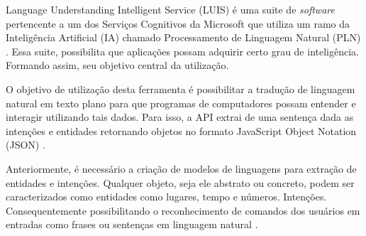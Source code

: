 Language Understanding Intelligent Service (LUIS) é uma suite de \textit{software} pertencente a um dos Serviços Cognitivos da Microsoft que utiliza um ramo da Inteligência Artificial (IA) chamado Processamento de Linguagem Natural (PLN) \cite{Mayo:2017}. Essa suite, possibilita que aplicações possam adquirir certo grau de inteligência. Formando assim, seu objetivo central da utilização.

O objetivo de utilização desta ferramenta é possibilitar a tradução de linguagem natural em texto plano para que programas de computadores possam entender e interagir utilizando tais dados. Para isso, a API extrai de uma sentença dada as intenções e entidades retornando objetos no formato JavaScript Object Notation (JSON) \cite{Mayo:2017}.

Anteriormente, é necessário a criação de modelos de linguagens para extração de entidades e intenções. Qualquer objeto, seja ele abstrato ou concreto, podem ser caracterizados como entidades como lugares, tempo e números. Intenções.  Consequentemente possibilitando o reconhecimento de comandos dos usuários em entradas como frases ou sentenças em linguagem natural \cite{Larsen:2017}.
